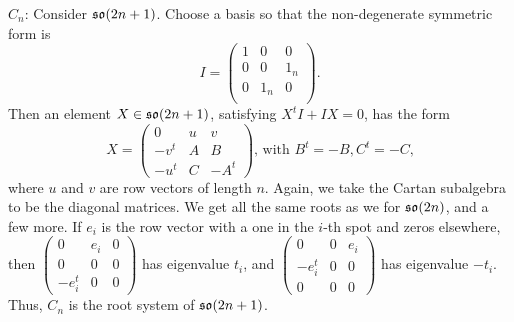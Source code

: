  \underline{$C_n$}:
 Consider $\mathfrak{so}(2n+1)$. Choose a basis so that the non-degenerate symmetric form is
 \[I = \left(\begin{array}{c|cc}
   1 & 0 & 0\\ \hline
   0 & 0 & 1_n\\
   0 & 1_n & 0\\
 \end{array}\right).
 \]
 Then an element $X\in \mathfrak{so}(2n+1)$, satisfying $X^tI+IX=0$, has the form
 \[
  X = \left(\begin{array}{c|cc}
   0 & u & v \\ \hline
   -v^t & A & B\\
   -u^t & C & -A^t
  \end{array}\right)\text{, with $B^t=-B, C^t=-C$,}
 \]
 where $u$ and $v$ are row vectors of length $n$. Again, we take the Cartan subalgebra
 to be the diagonal matrices. We get all the same roots as we for $\mathfrak{so}(2n)$, and a few
 more. If $e_i$ is the row vector with a one in the $i$-th spot and zeros elsewhere,
 then {\scriptsize $\left(\begin{array}{c|cc}
   0 & e_i & 0\\ \hline
   0 & 0 & 0 \\
   -e_i^t & 0 & 0
 \end{array}\right)$}
 has eigenvalue $t_i$, and
 {\scriptsize $\left(\begin{array}{c|cc}
   0 & 0 & e_i \\ \hline
   -e_i^t & 0 & 0 \\
   0 & 0 & 0
 \end{array}\right)$}
 has eigenvalue $-t_i$. Thus, $C_n$ is the root system of $\mathfrak{so}(2n+1)$.

